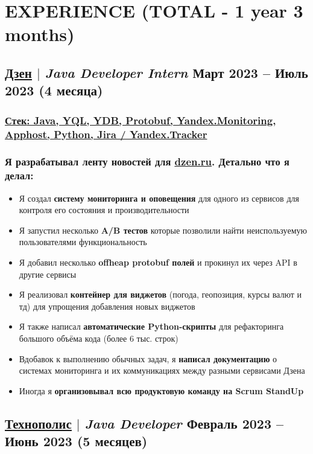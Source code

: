 \documentclass[11pt]{article}
\begin{document}
\section{EXPERIENCE (TOTAL - 1 year 3 months)}
\subsection{\href{https://dzen.ru}{\underline{Дзен}} $|$ {\normalfont\textit{Java Developer Intern}} \hfill Март 2023 -- Июль 2023 (4 месяца)}
\subsubsection{\underline{\textbf{Стек}: Java, YQL, YDB, Protobuf, Yandex.Monitoring, \href{https://habr.com/ru/companies/yandex/articles/520134/}{Apphost}, Python, Jira / Yandex.Tracker}}
\subsubsection{Я разрабатывал ленту новостей для \href{https://dzen.ru}{\underline{dzen.ru}}. Детально что я делал:}
\begin{itemize}
    \item Я создал \textbf{систему мониторинга и оповещения} для одного из сервисов для контроля его состояния и производительности
    \item Я запустил несколько \textbf{A/B тестов} которые позволили найти неиспользуемую пользователями функциональность
    \item Я добавил несколько \textbf{offheap protobuf полей} и прокинул их через API в другие сервисы
    \item Я реализовал \textbf{контейнер для виджетов} (погода, геопозиция, курсы валют и тд) для упрощения добавления новых виджетов
    \item Я также написал \textbf{автоматические Python-скрипты} для рефакторинга большого объёма кода (более 6 тыс. строк)
    \item Вдобавок к выполнению обычных задач, я \textbf{написал документацию} о системах мониторинга и их коммуникациях между разными сервисами Дзена
    \item Иногда я \textbf{организовывал всю продуктовую команду на Scrum StandUp}
\end{itemize}

\subsection{\href{https://polis.vk.company/}{\underline{Технополис}} $|$ {\normalfont\textit{Java Developer}} \hfill Февраль 2023 -- Июнь 2023 (5 месяцев)}
\end{document}
